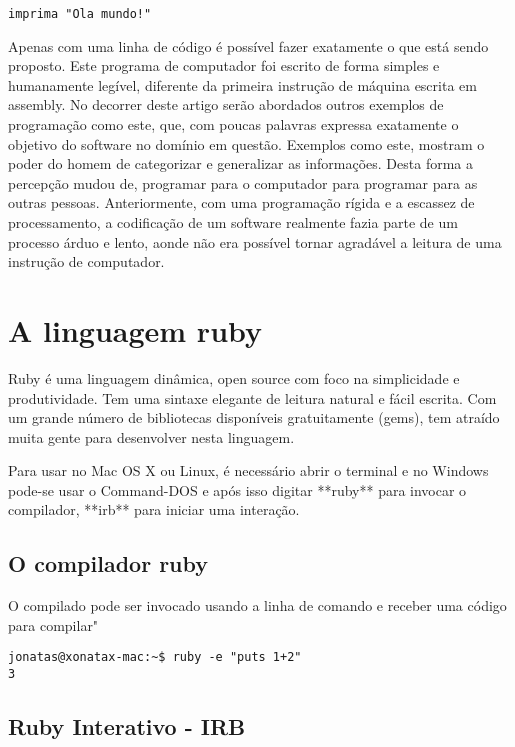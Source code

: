 \documentclass[12pt]{article}
\begin{document}
\begin{lstlisting}[caption=Tradução do programa ruby]
   imprima "Ola mundo!"
\end{lstlisting}

Apenas com uma linha de código é possível fazer exatamente o que está sendo proposto. Este programa de computador foi escrito de forma simples e humanamente legível, diferente da primeira instrução de máquina escrita em assembly. No decorrer deste artigo serão abordados outros exemplos de programação como este, que, com poucas palavras expressa exatamente o objetivo do software no domínio em questão.
Exemplos como este, mostram o poder do homem de categorizar e generalizar as informações. Desta forma a percepção mudou de, programar para o computador para programar para as outras pessoas. Anteriormente, com uma programação rígida e a escassez de processamento, a codificação de um software realmente fazia parte de um processo árduo e lento, aonde não era possível tornar agradável a leitura de uma instrução de computador.



\section { A linguagem ruby }

Ruby é uma linguagem dinâmica, open source com foco na simplicidade e produtividade. Tem uma sintaxe elegante de leitura natural e fácil escrita. Com um grande número de bibliotecas disponíveis gratuitamente (gems), tem atraído muita gente para desenvolver nesta linguagem.

Para usar no Mac OS X ou Linux, é necessário abrir o {terminal} e  no Windows pode-se usar o Command-DOS e após isso digitar **ruby** para invocar o compilador, **irb** para iniciar uma interação.

\subsection { O compilador ruby }

O compilado pode ser invocado usando a linha de comando e receber uma código para compilar"

\begin{lstlisting}[caption=Usando o compilador na linha de comando]
jonatas@xonatax-mac:~$ ruby -e "puts 1+2"
3
\end{lstlisting}

\subsection { Ruby Interativo - IRB }
\end{document}
